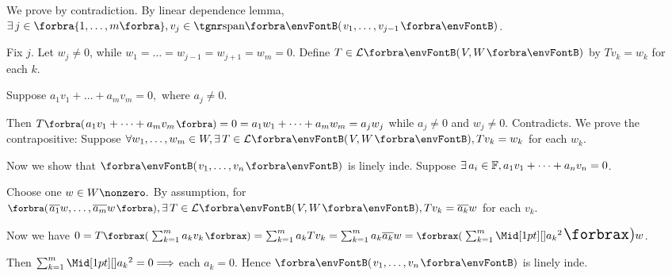 \par\quad
We prove by contradiction. By linear dependence lemma, $\exists\,j\in\Bra{1,\dots,m},v_j\in\Span{v_1,\dots,v_{j-1}}$.\par\quad
Fix $j$. Let $w_j\neq 0$, while $w_1=\dots=w_{j-1}=w_{j+1}=w_m=0.$ Define $T\in\Lm{V,W}$ by $Tv_k=w_k$ for each $k.$\par\quad
Suppose $a_1 v_1+\dots+a_m v_m=0,$ where $a_j\neq 0.$\par\quad
Then $T\BigPar{a_1 v_1+\dots+a_m v_m}=0=a_1 w_1+\dots+a_m w_m=a_j w_j$ while $a_j\neq 0$ and $w_j\neq 0.$ Contradicts.\PfEnd\vspace{6pt}\quad
\Or We prove the contrapositive: Suppose $\forall w_1,\dots,w_m\in W,\exists\,T\in\Lm{V,W},Tv_k=w_k$  for each $w_k.$\par\quad
{Now we show that $\Par{v_1,\dots,v_n}$ is linely inde. Suppose {$\exists\,a_i\in{\mathbb{F}},a_1 v_1+\dots+a_n v_n=0$}.}\vspace{2pt}\par\quad
{Choose one $w\in W\nonzero.$ By assumption, for {$\BigPar{\overline{a_1}w,\dots,\overline{a_m}w},\exists\,T\in\Lm{V,W},Tv_k=\overline{a_k}w$} for each $v_k$.}\vspace{2pt}\par\quad
{Now we have {$ 0=T\XPar{\sum_{k=1}^m a_k v_k}=\sum_{k=1}^m a_k Tv_k=\sum_{k=1}^m a_k\overline{a_k}w=\XPar{\sum_{k=1}^m \aMid{a_k}{^2}}w$}.}\par\quad
{Then {$\sum_{k=1}^m\aMid{a_k}{^2}=0\Longrightarrow$ each $a_k=0.$} Hence $\Par{v_1,\dots,v_n}$ is linely inde.}\PfEnd
\SepLine

